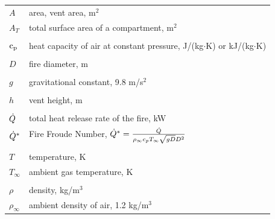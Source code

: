 \documentclass[12pt,twoside]{book}
\begin{document}
\begin{center}
\begin{longtable}{p{1in}  p{5.5 in}}

$A$                 & area, vent area, m$^2$ \\
$A_T$               & total surface area of a compartment, m$^2$ \\ \\
${\rm c}_{\rm p}$               & heat capacity of air at constant pressure, J/(kg$\cdot$K) or kJ/(kg$\cdot$K) \\ \\
$D$                 & fire diameter, m \\ \\
$g$                 & gravitational constant, 9.8 m/s$^2$ \\ \\
$h$                 & vent height, m \\ \\
$\dot{Q}$               & total heat release rate of the fire, kW \\
$\dot{Q}^*$             & Fire Froude Number,  $\dot{Q}^* = \frac{\dot{Q}}{\rho_\infty c_p T_\infty \sqrt{gD} D^2}$ \\ \\
$T$                 & temperature, K \\
$T_\infty$          & ambient gas temperature, K \\ \\
$\rho$              & density, kg/m$^3$ \\
$\rho_\infty$       & ambient density of air, 1.2 kg/m$^3$ \\
\end{longtable}

\end{center}






\label{last_page}
\end{document}
